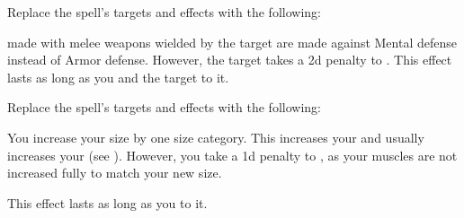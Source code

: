 Replace the spell's targets and effects with the following:
\begin{spellcontent}

\begin{augmenttargetinginfo}



\end{augmenttargetinginfo}


\begin{augmenteffects}



\spelleffect
{} made with melee weapons wielded by the target are made against Mental defense instead of Armor defense.
However, the target takes a \minus2d penalty to .
This effect lasts as long as you and the target  to it.








\end{augmenteffects}

\end{spellcontent}








Replace the spell's targets and effects with the following:
\begin{spellcontent}

\begin{augmenttargetinginfo}



\end{augmenttargetinginfo}


\begin{augmenteffects}



\spelleffect
You increase your size by one size category.
This increases your  and usually increases your  (see ).
However, you take a \minus1d penalty to , as your muscles are not increased fully to match your new size.

This effect lasts as long as you  to it.








\end{augmenteffects}

\end{spellcontent}





